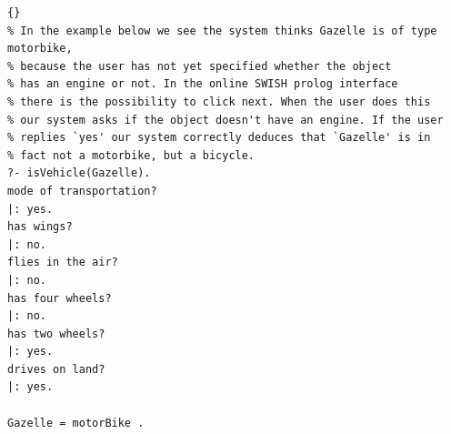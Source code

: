 \begin{lstlisting}{}
% In the example below we see the system thinks Gazelle is of type motorbike,
% because the user has not yet specified whether the object
% has an engine or not. In the online SWISH prolog interface
% there is the possibility to click next. When the user does this
% our system asks if the object doesn't have an engine. If the user
% replies `yes' our system correctly deduces that `Gazelle' is in
% fact not a motorbike, but a bicycle.
?- isVehicle(Gazelle).
mode of transportation?
|: yes.
has wings?
|: no.
flies in the air?
|: no.
has four wheels?
|: no.
has two wheels?
|: yes.
drives on land?
|: yes.

Gazelle = motorBike .
\end{lstlisting}
